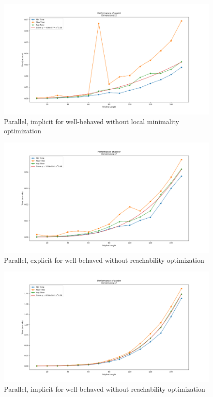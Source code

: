 \begin{figure}[ht]
  \centering
  \includegraphics[scale=0.5, width=\linewidth]{figures/pseinl.png}
  \caption{Parallel, implicit for well-behaved without local minimality optimization}
  \label{fig:pseinl}
\end{figure}

\begin{figure}[ht]
  \centering
  \includegraphics[scale=0.5, width=\linewidth]{figures/psenr.png}
  \caption{Parallel, explicit for well-behaved without reachability optimization}
  \label{fig:psenr}
\end{figure}

\begin{figure}[ht]
  \centering
  \includegraphics[scale=0.5, width=\linewidth]{figures/pseinr.png}
  \caption{Parallel, implicit for well-behaved without reachability optimization}
  \label{fig:pseinr}
\end{figure}

